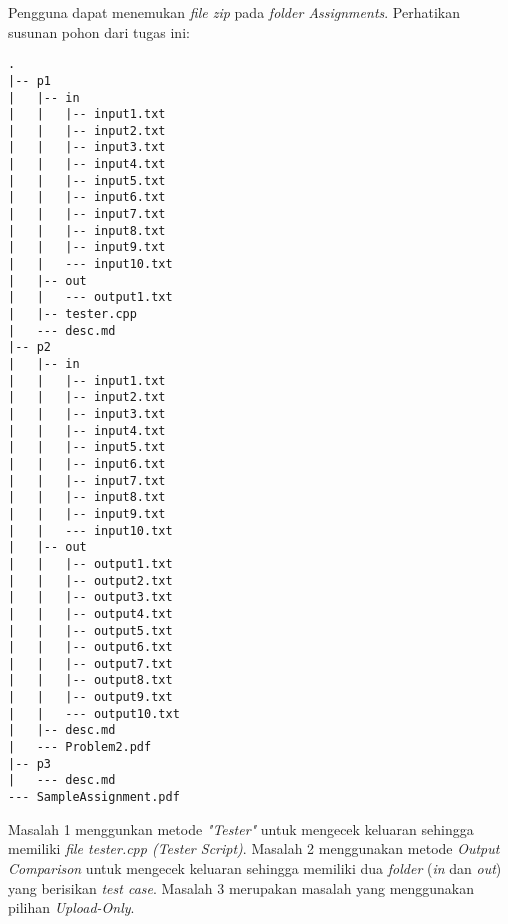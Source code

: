 Pengguna dapat menemukan \textit{file zip} pada \textit{folder Assignments}. Perhatikan susunan pohon dari tugas ini:
\begin{lstlisting}[backgroundcolor = \color{lightgray}]
.
|-- p1
|   |-- in
|   |   |-- input1.txt
|   |   |-- input2.txt
|   |   |-- input3.txt
|   |   |-- input4.txt
|   |   |-- input5.txt
|   |   |-- input6.txt
|   |   |-- input7.txt
|   |   |-- input8.txt
|   |   |-- input9.txt
|   |   --- input10.txt
|   |-- out
|   |   --- output1.txt
|   |-- tester.cpp
|   --- desc.md
|-- p2
|   |-- in
|   |   |-- input1.txt
|   |   |-- input2.txt
|   |   |-- input3.txt
|   |   |-- input4.txt
|   |   |-- input5.txt
|   |   |-- input6.txt
|   |   |-- input7.txt
|   |   |-- input8.txt
|   |   |-- input9.txt
|   |   --- input10.txt
|   |-- out
|   |   |-- output1.txt
|   |   |-- output2.txt
|   |   |-- output3.txt
|   |   |-- output4.txt
|   |   |-- output5.txt
|   |   |-- output6.txt
|   |   |-- output7.txt
|   |   |-- output8.txt
|   |   |-- output9.txt
|   |   --- output10.txt
|   |-- desc.md
|   --- Problem2.pdf
|-- p3
|   --- desc.md
--- SampleAssignment.pdf
\end{lstlisting}
Masalah 1 menggunkan metode \textit{"Tester"} untuk mengecek keluaran sehingga memiliki \textit{file tester.cpp (Tester Script)}. Masalah 2 menggunakan metode \textit{Output Comparison} untuk mengecek keluaran sehingga memiliki dua \textit{folder} (\textit{in} dan \textit{out}) yang berisikan \textit{test case}. Masalah 3 merupakan masalah yang menggunakan pilihan \textit{Upload-Only}.

